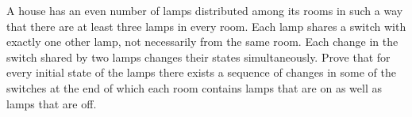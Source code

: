 A house has an even number of lamps distributed among its rooms in such a way that there are at least three lamps in every room. Each lamp shares a switch with exactly one other lamp, not necessarily from the same room. Each change in the switch shared by two lamps changes their states simultaneously. Prove that for every initial state of the lamps there exists a sequence of changes in some of the switches at the end of which each room contains lamps that are on as well as lamps that are off.
